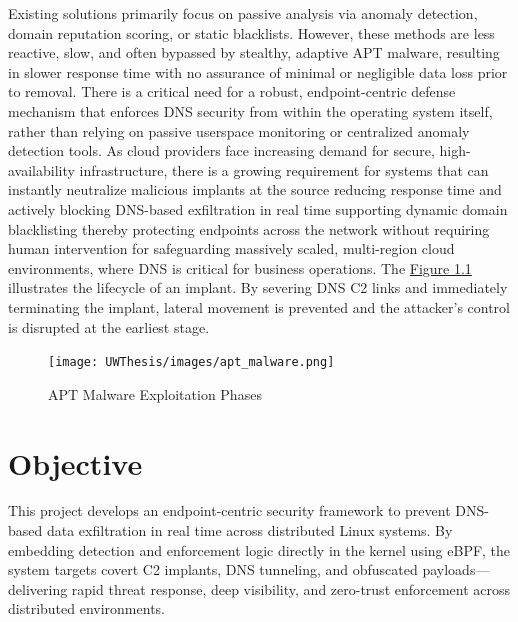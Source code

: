 \documentclass [11pt, proquest] {uwthesis}[2020/02/24]
\begin{document}
Existing solutions primarily focus on passive analysis via anomaly detection, domain reputation scoring, or static blacklists. However, these methods are less reactive, slow, and often bypassed by stealthy, adaptive APT malware, resulting in slower response time with no assurance of minimal or negligible data loss prior to removal.
There is a critical need for a robust, endpoint-centric defense mechanism that enforces DNS security from within the operating system itself, rather than relying on passive userspace monitoring or centralized anomaly detection tools. As cloud providers face increasing demand for secure, high-availability infrastructure, there is a growing requirement for systems that can instantly neutralize malicious implants at the source reducing response time and actively blocking DNS-based exfiltration in real time supporting dynamic domain blacklisting thereby protecting endpoints across the network without requiring human intervention for safeguarding massively scaled, multi-region cloud environments, where DNS is critical for business operations.
The \hyperref[sec:apt_malware_flow]{Figure 1.1} illustrates the lifecycle of an implant. By severing DNS C2 links and immediately terminating the implant, lateral movement is prevented and the attacker’s control is disrupted at the earliest stage.
\begin{figure}[H]
\texttt{[image: UWThesis/images/apt\_malware.png]}
\caption{APT Malware Exploitation Phases}
\label{sec:apt_malware_flow}
\end{figure}

\section{Objective}
This project develops an endpoint-centric security framework to prevent DNS-based data exfiltration in real time across distributed Linux systems. By embedding detection and enforcement logic directly in the kernel using eBPF, the system targets covert C2 implants, DNS tunneling, and obfuscated payloads—delivering rapid threat response, deep visibility, and zero-trust enforcement across distributed environments.
\end{document}
